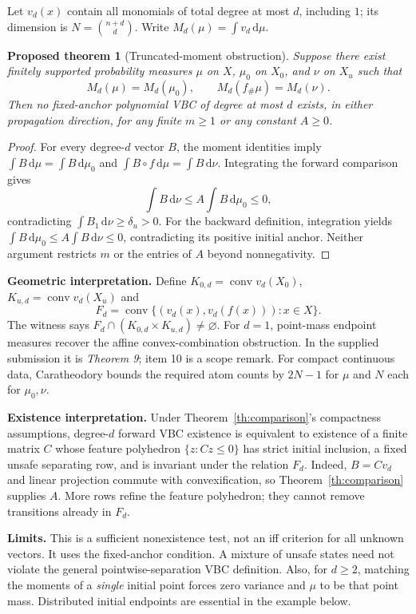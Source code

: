 \documentclass[10pt,letterpaper]{article}
\newtheorem{theorem}{Proposed theorem}
\newcommand{\co}{\operatorname{conv}}
\newcommand{\dd}{\,\mathrm d}
\begin{document}
Let $v_d(x)$ contain all monomials of total degree at most $d$, including $1$; its dimension is $N=\binom{n+d}{d}$. Write $M_d(\mu)=\int v_d\dd\mu$.
\begin{theorem}[Truncated-moment obstruction]\label{th:moment}
Suppose there exist finitely supported probability measures $\mu$ on $X$, $\mu_0$ on $X_0$, and $\nu$ on $X_u$ such that
\begin{equation}\label{eq:moments}
 M_d(\mu)=M_d(\mu_0),\qquad M_d(f_\#\mu)=M_d(\nu).
\end{equation}
Then no fixed-anchor polynomial VBC of degree at most $d$ exists, in either propagation direction, for any finite $m\geq1$ or any constant $A\geq0$.
\end{theorem}
\begin{proof}
For every degree-$d$ vector $B$, the moment identities imply $\int B\dd\mu=\int B\dd\mu_0$ and $\int B\circ f\dd\mu=\int B\dd\nu$. Integrating the forward comparison gives
\[
 \int B\dd\nu\leq A\int B\dd\mu_0\leq0,
\]
contradicting $\int B_1\dd\nu\geq\delta_u>0$. For the backward definition, integration yields $\int B\dd\mu_0\leq A\int B\dd\nu\leq0$, contradicting its positive initial anchor. Neither argument restricts $m$ or the entries of $A$ beyond nonnegativity.
\end{proof}

\textbf{Geometric interpretation.} Define $K_{0,d}=\co v_d(X_0)$, $K_{u,d}=\co v_d(X_u)$ and
\[
 F_d=\co\{(v_d(x),v_d(f(x))):x\in X\}.
\]
The witness says $F_d\cap(K_{0,d}\times K_{u,d})\ne\varnothing$. For $d=1$, point-mass endpoint measures recover the affine convex-combination obstruction. In the supplied submission it is \emph{Theorem 9}; item 10 is a scope remark. For compact continuous data, Caratheodory bounds the required atom counts by $2N-1$ for $\mu$ and $N$ each for $\mu_0,\nu$.

\textbf{Existence interpretation.} Under Theorem~\ref{th:comparison}'s compactness assumptions, degree-$d$ forward VBC existence is equivalent to existence of a finite matrix $C$ whose feature polyhedron $\{z:Cz\leq0\}$ has strict initial inclusion, a fixed unsafe separating row, and is invariant under the relation $F_d$. Indeed, $B=Cv_d$ and linear projection commute with convexification, so Theorem~\ref{th:comparison} supplies $A$. More rows refine the feature polyhedron; they cannot remove transitions already in $F_d$.

\textbf{Limits.} This is a sufficient nonexistence test, not an iff criterion for all unknown vectors. It uses the fixed-anchor condition. A mixture of unsafe states need not violate the general pointwise-separation VBC definition. Also, for $d\geq2$, matching the moments of a \emph{single} initial point forces zero variance and $\mu$ to be that point mass. Distributed initial endpoints are essential in the example below.
\end{document}
